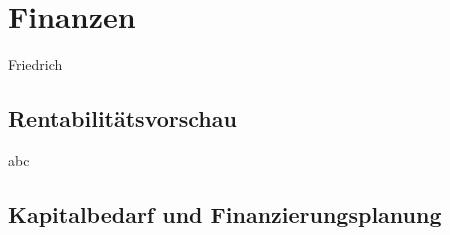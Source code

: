 
\section{Finanzen}
Friedrich

\subsection{Rentabilitätsvorschau}
abc
\subsection{Kapitalbedarf und Finanzierungsplanung}